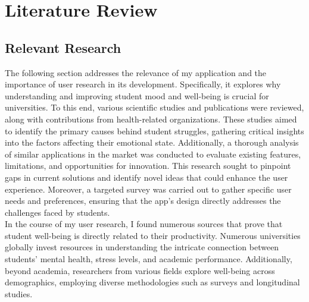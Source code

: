 \chapter{Literature Review}

\section{Relevant Research}

The following section addresses the relevance of my application and the importance of user research in its development. Specifically, it explores why understanding and improving student mood and well-being is crucial for universities. To this end, various scientific studies and publications were reviewed, along with contributions from health-related organizations. These studies aimed to identify the primary causes behind student struggles, gathering critical insights into the factors affecting their emotional state. Additionally, a thorough analysis of similar applications in the market was conducted to evaluate existing features, limitations, and opportunities for innovation. This research sought to pinpoint gaps in current solutions and identify novel ideas that could enhance the user experience. Moreover, a targeted survey was carried out to gather specific user needs and preferences, ensuring that the app's design directly addresses the challenges faced by students.\vspace{5mm} \\
In the course of my user research, I found numerous sources that prove that student well-being is directly related to their productivity. Numerous universities globally invest resources in understanding the intricate connection between students' mental health, stress levels, and academic performance. Additionally, beyond academia, researchers from various fields explore well-being across demographics, employing diverse methodologies such as surveys and longitudinal studies.

